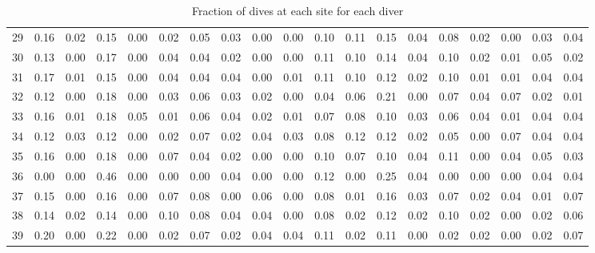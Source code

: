 \documentclass[a4paper]{article}
\begin{document}
\begin{sidewaystable}[h!]
{\begin{tabular}{rrrrrrrrrrrrrrrrrrr}
  29 & 0.16 & 0.02 & 0.15 & 0.00 & 0.02 & 0.05 & 0.03 & 0.00 & 0.00 & 0.10 & 0.11 & 0.15 & 0.04 & 0.08 & 0.02 & 0.00 & 0.03 & 0.04 \\ 
  30 & 0.13 & 0.00 & 0.17 & 0.00 & 0.04 & 0.04 & 0.02 & 0.00 & 0.00 & 0.11 & 0.10 & 0.14 & 0.04 & 0.10 & 0.02 & 0.01 & 0.05 & 0.02 \\ 
  31 & 0.17 & 0.01 & 0.15 & 0.00 & 0.04 & 0.04 & 0.04 & 0.00 & 0.01 & 0.11 & 0.10 & 0.12 & 0.02 & 0.10 & 0.01 & 0.01 & 0.04 & 0.04 \\ 
  32 & 0.12 & 0.00 & 0.18 & 0.00 & 0.03 & 0.06 & 0.03 & 0.02 & 0.00 & 0.04 & 0.06 & 0.21 & 0.00 & 0.07 & 0.04 & 0.07 & 0.02 & 0.01 \\ 
  33 & 0.16 & 0.01 & 0.18 & 0.05 & 0.01 & 0.06 & 0.04 & 0.02 & 0.01 & 0.07 & 0.08 & 0.10 & 0.03 & 0.06 & 0.04 & 0.01 & 0.04 & 0.04 \\ 
  34 & 0.12 & 0.03 & 0.12 & 0.00 & 0.02 & 0.07 & 0.02 & 0.04 & 0.03 & 0.08 & 0.12 & 0.12 & 0.02 & 0.05 & 0.00 & 0.07 & 0.04 & 0.04 \\ 
  35 & 0.16 & 0.00 & 0.18 & 0.00 & 0.07 & 0.04 & 0.02 & 0.00 & 0.00 & 0.10 & 0.07 & 0.10 & 0.04 & 0.11 & 0.00 & 0.04 & 0.05 & 0.03 \\ 
  36 & 0.00 & 0.00 & 0.46 & 0.00 & 0.00 & 0.00 & 0.04 & 0.00 & 0.00 & 0.12 & 0.00 & 0.25 & 0.04 & 0.00 & 0.00 & 0.00 & 0.04 & 0.04 \\ 
  37 & 0.15 & 0.00 & 0.16 & 0.00 & 0.07 & 0.08 & 0.00 & 0.06 & 0.00 & 0.08 & 0.01 & 0.16 & 0.03 & 0.07 & 0.02 & 0.04 & 0.01 & 0.07 \\ 
  38 & 0.14 & 0.02 & 0.14 & 0.00 & 0.10 & 0.08 & 0.04 & 0.04 & 0.00 & 0.08 & 0.02 & 0.12 & 0.02 & 0.10 & 0.02 & 0.00 & 0.02 & 0.06 \\ 
  39 & 0.20 & 0.00 & 0.22 & 0.00 & 0.02 & 0.07 & 0.02 & 0.04 & 0.04 & 0.11 & 0.02 & 0.11 & 0.00 & 0.02 & 0.02 & 0.00 & 0.02 & 0.07 \\ 
   \hline
\end{tabular}
}
\caption{Fraction of dives at each site for each diver} 
\label{table1}
\end{sidewaystable}

\end{document}
